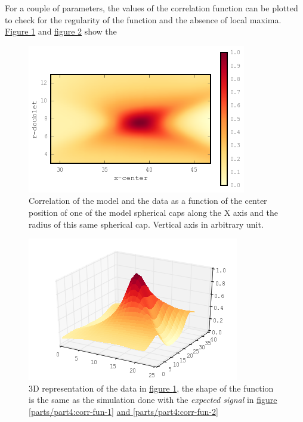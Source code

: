 \documentclass[A4paperpaper,11pt,english]{sphinxmanual}
\begin{document}
For a couple of parameters, the values of the correlation function can be plotted
to check for the regularity of the function and the absence of local maxima. \hyperref[parts/part4:gof2d]{Figure  \ref*{parts/part4:gof2d}} and \hyperref[parts/part4:gof3d]{figure  \ref*{parts/part4:gof3d}} show the
\begin{figure}[htbp]
\centering
\capstart

\includegraphics[width=0.600\linewidth]{gof-2d-doublets.png}
\caption{Correlation of the model and the data as a function of the center position
of one of the model spherical caps along the X axis and the radius of this
same spherical cap. Vertical axis in arbitrary unit.}\label{parts/part4:gof2d}\end{figure}
\begin{figure}[htbp]
\centering
\capstart

\includegraphics[width=0.600\linewidth]{gof-3d-doublets.png}
\caption{3D representation of the data in \hyperref[parts/part4:gof2d]{figure  \ref*{parts/part4:gof2d}}, the shape of the
function is the same as the simulation done with the \emph{expected signal} in
\hyperref[parts/part4:corr-fun-1]{figure  \ref*{parts/part4:corr-fun-1}} \hyperref[parts/part4:corr-fun-2]{and  \ref*{parts/part4:corr-fun-2}}}\label{parts/part4:gof3d}\end{figure}
\end{document}
